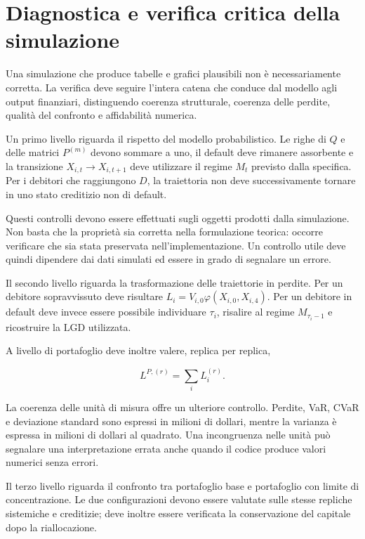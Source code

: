 \section{Diagnostica e verifica critica della simulazione}

Una simulazione che produce tabelle e grafici plausibili non \`e
necessariamente corretta. La verifica deve seguire l'intera catena che
conduce dal modello agli output finanziari, distinguendo coerenza
strutturale, coerenza delle perdite, qualit\`a del confronto e affidabilit\`a
numerica.

Un primo livello riguarda il rispetto del modello probabilistico. Le righe
di $Q$ e delle matrici $P^{(m)}$ devono sommare a uno, il default deve
rimanere assorbente e la transizione $X_{i,t}\to X_{i,t+1}$ deve utilizzare
il regime $M_t$ previsto dalla specifica. Per i debitori che raggiungono
$D$, la traiettoria non deve successivamente tornare in uno stato creditizio
non di default.

Questi controlli devono essere effettuati sugli oggetti prodotti dalla
simulazione. Non basta che la propriet\`a sia corretta nella formulazione
teorica: occorre verificare che sia stata preservata nell'implementazione.
Un controllo utile deve quindi dipendere dai dati simulati ed essere in
grado di segnalare un errore.

Il secondo livello riguarda la trasformazione delle traiettorie in perdite.
Per un debitore sopravvissuto deve risultare
$L_i=V_{i,0}\varphi(X_{i,0},X_{i,4})$. Per un debitore in default deve invece
essere possibile individuare $\tau_i$, risalire al regime
$M_{\tau_i-1}$ e ricostruire la $\mathrm{LGD}$ utilizzata.

A livello di portafoglio deve inoltre valere, replica per replica,

\[
L^{P,(r)}
=
\sum_i L_i^{(r)}.
\]

La coerenza delle unit\`a di misura offre un ulteriore controllo. Perdite,
VaR, CVaR e deviazione standard sono espressi in milioni di dollari, mentre
la varianza \`e espressa in milioni di dollari al quadrato. Una
incongruenza nelle unit\`a pu\`o segnalare una interpretazione errata anche
quando il codice produce valori numerici senza errori.

Il terzo livello riguarda il confronto tra portafoglio base e portafoglio
con limite di concentrazione. Le due configurazioni devono essere valutate
sulle stesse repliche sistemiche e creditizie; deve inoltre essere verificata
la conservazione del capitale dopo la riallocazione.

